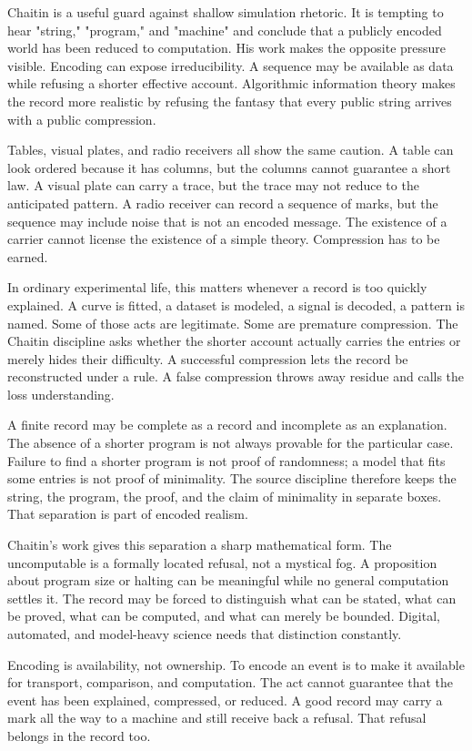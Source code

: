 Chaitin is a useful guard against shallow simulation rhetoric. It is
tempting to hear "string," "program," and "machine" and conclude that a
publicly encoded world has been reduced to computation. His work makes
the opposite pressure visible. Encoding can expose irreducibility. A
sequence may be available as data while refusing a shorter effective
account. Algorithmic information theory makes the record more realistic
by refusing the fantasy that every public string arrives with a public
compression.

Tables, visual plates, and radio receivers all show the same caution. A
table can look ordered because it has columns, but the columns cannot
guarantee a short law. A visual plate can carry a trace, but the trace
may not reduce to the anticipated pattern. A radio receiver can record a
sequence of marks, but the sequence may include noise that is not an
encoded message. The existence of a carrier cannot license the existence
of a simple theory. Compression has to be earned.

In ordinary experimental life, this matters whenever a record is too
quickly explained. A curve is fitted, a dataset is modeled, a signal is
decoded, a pattern is named. Some of those acts are legitimate. Some are
premature compression. The Chaitin discipline asks whether the shorter
account actually carries the entries or merely hides their difficulty. A
successful compression lets the record be reconstructed under a rule. A
false compression throws away residue and calls the loss understanding.

A finite record may be complete as a record and incomplete as an
explanation. The absence of a shorter program is not always provable for
the particular case. Failure to find a shorter program is not proof of
randomness; a model that fits some entries is not proof of minimality.
The source discipline therefore keeps the string, the program, the
proof, and the claim of minimality in separate boxes. That separation is
part of encoded realism.

Chaitin's work gives this separation a sharp mathematical form. The
uncomputable is a formally located refusal, not a mystical fog. A
proposition about program size or halting can be meaningful while no
general computation settles it. The record may be forced to distinguish
what can be stated, what can be proved, what can be computed, and what
can merely be bounded. Digital, automated, and model-heavy science needs
that distinction constantly.

Encoding is availability, not ownership. To encode an event is to make it
available for transport, comparison, and computation. The act cannot
guarantee that the event has been explained, compressed, or reduced. A
good record may carry a mark all the way to a machine and still receive
back a refusal. That refusal belongs in the record too.

